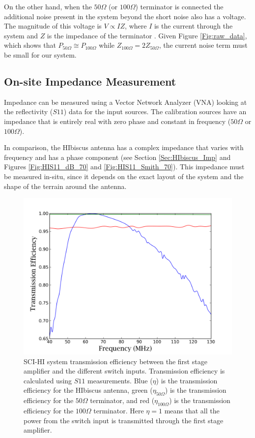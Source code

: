 On the other hand, when the $50 \Omega$ (or $100 \Omega$) terminator is connected the additional noise present in the system beyond the short noise also has a voltage. The magnitude of this voltage is $V\propto I Z$, where $I$ is the current through the system and $Z$ is the impedance of the terminator \cite{stutzman1981}. Given Figure \ref{Fig:raw_data}, which shows that $P_{50 \Omega} \cong P_{100 \Omega}$ while $Z_{100 \Omega} = 2 Z_{50 \Omega}$, the current noise term must be small for our system. 


\subsection{On-site Impedance Measurement}

Impedance can be measured using a Vector Network Analyzer (VNA) looking at the reflectivity ($S11$) data for the input sources. The calibration sources have an impedance that is entirely real with zero phase and constant in frequency ($50 \Omega$ or $100 \Omega$).

In comparison, the HIbiscus antenna has a complex impedance that varies with frequency and has a phase component (see Section \ref{Sec:HIbiscus_Imp} and Figures \ref{Fig:HIS11_dB_70} and \ref{Fig:HIS11_Smith_70}). This impedance must be measured in-situ, since it depends on the exact layout of the system and the shape of the terrain around the antenna. 

\begin{figure}[htb]
\begin{center}
\includegraphics[width=0.9\linewidth]{Data_analysis/figures/efftest.png}
\caption{SCI-HI system transmission efficiency between the first stage amplifier and the different switch inputs. Transmission efficiency is calculated using $S11$ measurements. Blue ($\eta$) is the transmission efficiency for the HIbiscus antenna, green ($\eta_{50 \Omega}$) is the transmission efficiency for the $50 \Omega$ terminator, and red ($\eta_{100 \Omega}$) is the transmission efficiency for the $100 \Omega$ terminator. Here $\eta = 1$ means that all the power from the switch input is transmitted through the first stage amplifier.}
\label{Fig:eff}
\end{center}
\end{figure}

